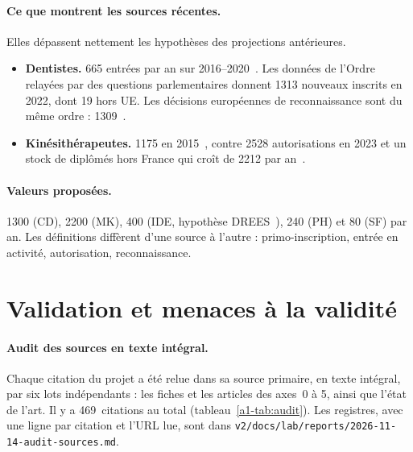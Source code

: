 \paragraph{Ce que montrent les sources récentes.}
Elles dépassent nettement les hypothèses des projections antérieures.
\begin{itemize}
\item \textbf{Dentistes.} \num{665} entrées par an sur 2016--2020~\cite{a1-dd76}.
  Les données de l'Ordre relayées par des questions parlementaires donnent
  \num{1313} nouveaux inscrits en 2022, dont 19 hors UE. Les décisions
  européennes de reconnaissance sont du même ordre :
  \num{1309}~\cite{a1-regprof}.
\item \textbf{Kinésithérapeutes.} \num{1175} en 2015~\cite{a1-er1075}, contre
  \num{2528} autorisations en 2023 et un stock de diplômés hors France qui
  croît de \num{2212}\derive{} par an~\cite{a1-cnomk2024}.
\end{itemize}

\paragraph{Valeurs proposées.}
\num{1300} (CD), \num{2200}\derive{} (MK), 400 (IDE, hypothèse
DREES~\cite{a1-er1319}), 240\derive{} (PH) et 80\derive{} (SF) par an. Les
définitions diffèrent d'une source à l'autre : primo-inscription, entrée
en activité, autorisation, reconnaissance.

\section{Validation et menaces à la validité}

\paragraph{Audit des sources en texte intégral.}
Chaque citation du projet a été relue dans sa source primaire, en texte
intégral, par six lots indépendants : les fiches et les articles des
axes~0 à 5, ainsi que l'état de l'art. Il y a 469~citations au total
(tableau~\ref{a1-tab:audit}). Les registres, avec une ligne par citation et
l'URL lue, sont dans \texttt{v2/docs/lab/reports/2026-11-14-audit-sources.md}.

